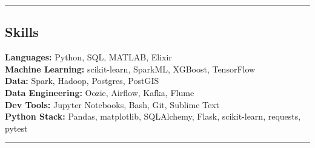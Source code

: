 \documentclass[10pt,letterpaper]{article}
\newenvironment{indentsection}[1]%
{\begin{list}{}%
	{\setlength{\leftmargin}{#1}}%
	\item[]%
}
{\end{list}}
\begin{document}
\hrule
\subsection*{Skills}
	\begin{indentsection}{\parindent}
		\textbf{Languages:} Python, SQL, MATLAB, Elixir \\
		\textbf{Machine Learning:} scikit-learn, SparkML, XGBoost, TensorFlow \\	
		\textbf{Data:} Spark, Hadoop, Postgres, PostGIS \\
		\textbf{Data Engineering:} Oozie, Airflow, Kafka, Flume  \\  
		\textbf{Dev Tools:} Jupyter Notebooks, Bash, Git,  Sublime Text \\  
		\textbf{Python Stack:} Pandas, matplotlib, SQLAlchemy, Flask, scikit-learn, requests, pytest
	\end{indentsection}

\hrule
\end{document}
